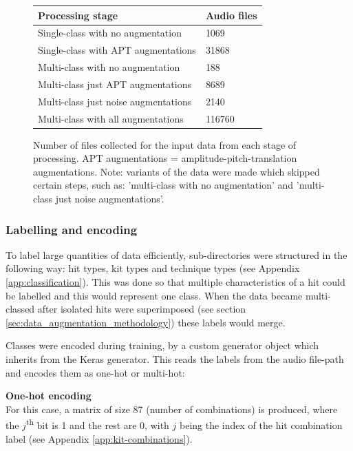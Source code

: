 \documentclass[12pt]{article}
\begin{document}
    \begin{figure}[H]
        \centering
        \begin{tabular}{l|l}
            Processing stage & Audio files\\
            \hline
            Single-class with no augmentation & 1069\\
            Single-class with APT augmentations & 31868\\
            Multi-class with no augmentation & 188\\
            Multi-class just APT augmentations & 8689\\
            Multi-class just noise augmentations & 2140\\
            Multi-class with all augmentations & 116760\\\bottomrule
        \end{tabular}
        \caption{\footnotesize{Number of files collected for the input data from each stage of processing. APT augmentations = amplitude-pitch-translation augmentations. Note: variants of the data were made which skipped certain steps, such as: 'multi-class with no augmentation' and 'multi-class just noise augmentations'.}}
        \label{fig:data_origin_table}
    \end{figure}
    
    \subsubsection{Labelling and encoding}
    \label{sec:labelling_and_encoding}
    To label large quantities of data efficiently, sub-directories were structured in the following way: hit types, kit types and technique types (see Appendix \ref{app:classification}). This was done so that multiple characteristics of a hit could be labelled and this would represent one class. When the data became multi-classed after isolated hits were superimposed (see section \ref{sec:data_augmentation_methodology}) these labels would merge.\medskip
    
    Classes were encoded during training, by a custom generator object which inherits from the Keras generator. This reads the labels from the audio file-path and encodes them as one-hot or multi-hot:\medskip
    
    \textbf{One-hot encoding}\\
    For this case, a matrix of size 87 (number of combinations) is produced, where the $j$\textsuperscript{th} bit is 1 and the rest are 0, with $j$ being the index of the hit combination label (see Appendix \ref{app:kit-combinations}).\medskip
    
\end{document}
